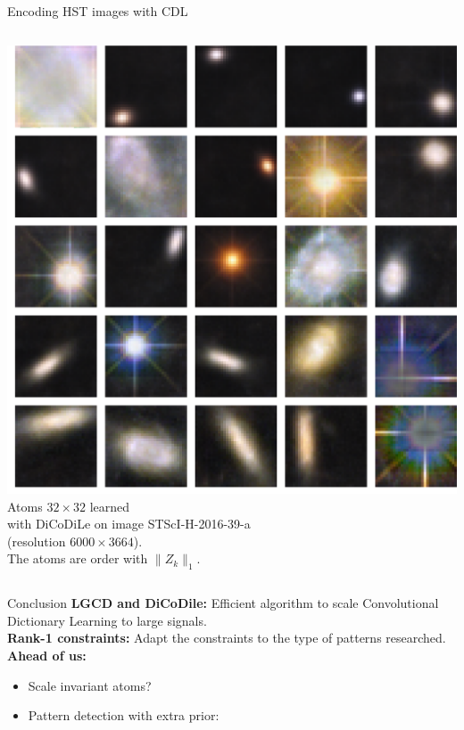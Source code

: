 \documentclass{beamer}
\begin{document}
\begin{frame}{Encoding HST images with CDL}
\begin{columns}[c]
    \includegraphics[height=.8\textheight]{K25_L32_reg0,1_seed42_dicodile_Medium_dict.png}
        Atoms $32\times 32$ learned\\
        with DiCoDiLe on image STScI-H-2016-39-a\\(resolution $6000\times 3664$).\\[1em]
        
        The atoms are order with $\|Z_k\|_1$.
\end{columns}
\end{frame}

\begin{frame}{Conclusion}
\textbf{LGCD and DiCoDile: } Efficient algorithm to scale Convolutional Dictionary Learning to large signals.\\[1.5em]
\textbf{Rank-1 constraints: } Adapt the constraints to the type of patterns researched.\\[2.5em]

\textbf{Ahead of us:}\\[1em]

\begin{itemize}\itemsep1em
    \item Scale invariant atoms?
    \item Pattern detection with extra prior:
\end{itemize}

\end{frame}
\end{document}
